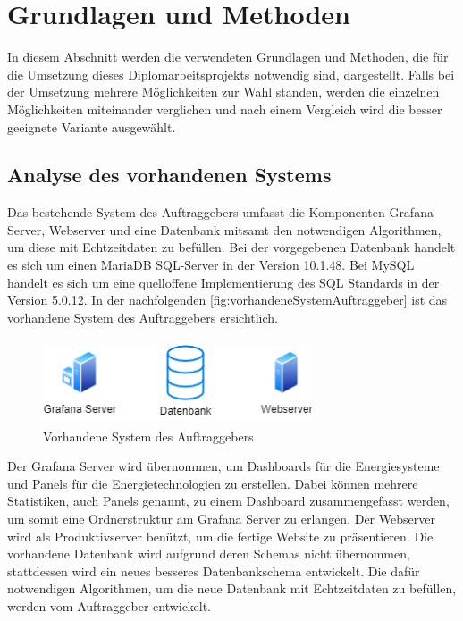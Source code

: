 \chapter{Grundlagen und Methoden} 
In diesem Abschnitt werden die verwendeten Grundlagen und Methoden, die für die Umsetzung dieses Diplomarbeitsprojekts notwendig sind, dargestellt. Falls bei der Umsetzung mehrere Möglichkeiten zur Wahl standen, werden die einzelnen Möglichkeiten miteinander verglichen und nach einem Vergleich wird die besser geeignete Variante ausgewählt.


\section{Analyse des vorhandenen Systems}
Das bestehende System des Auftraggebers umfasst die Komponenten Grafana Server, Webserver und eine Datenbank mitsamt den notwendigen Algorithmen, um diese mit Echtzeitdaten zu befüllen. Bei der vorgegebenen Datenbank handelt es sich um einen MariaDB SQL-Server in der Version 10.1.48. Bei MySQL handelt es sich um eine quelloffene Implementierung des SQL Standards in der Version 5.0.12. In der nachfolgenden \autoref{fig:vorhandeneSystemAuftraggeber}  ist das vorhandene System des Auftraggebers ersichtlich.
\newline

\begin{figure}[h]
	\centering
	\includegraphics[height=2.5cm,width=8cm]{images/vorhandeneSystemAuftraggeber}
	\caption{ Vorhandene System des Auftraggebers}
	\label{fig:vorhandeneSystemAuftraggeber}
\end{figure}
Der Grafana Server wird übernommen, um Dashboards für die Energiesysteme und Panels für die Energietechnologien zu erstellen. Dabei können mehrere Statistiken, auch Panels genannt, zu einem Dashboard zusammengefasst werden, um somit eine Ordnerstruktur am Grafana Server zu erlangen. Der Webserver wird als Produktivserver benützt, um die fertige Website zu präsentieren. Die vorhandene Datenbank wird aufgrund deren Schemas nicht übernommen, stattdessen wird ein neues besseres Datenbankschema entwickelt. Die dafür notwendigen Algorithmen, um die neue Datenbank mit Echtzeitdaten zu befüllen, werden vom Auftraggeber entwickelt.


